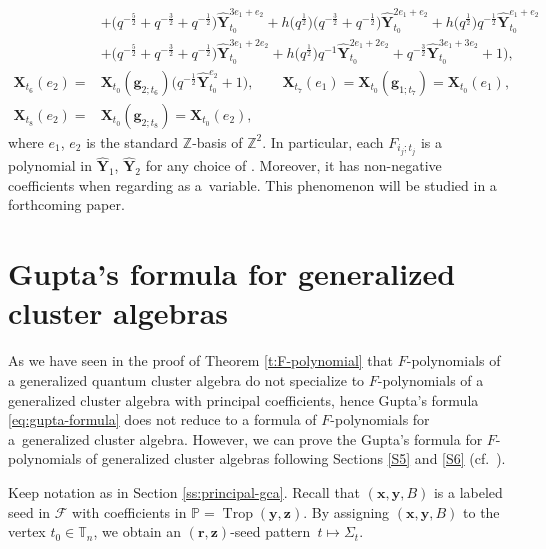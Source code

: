 \documentclass[pdftex]{sigma}
\numberwithin{equation}{section}
\begin{document}
\begin{Example}[type $G_{2}$]
\begin{align*}
 & +\bigl(q^{-\frac{5}{2}}+q^{-\frac{3}{2}}+q^{-\frac{1}{2}}\bigr)\mathbf{\hat{Y}}_{t_0}^{3e_1+e_2}+h\bigl(q^{\frac{1}{2}}\bigr)\bigl(q^{-\frac{3}{2}}+q^{-\frac{1}{2}}\bigr)
 \mathbf{\hat{Y}}_{t_0}^{2e_1+e_2}+h\bigl(q^{\frac{1}{2}}\bigr)q^{-\frac{1}{2}}\mathbf{\hat{Y}}_{t_0}^{e_1+e_2}\\
 & +\bigl(q^{-\frac{5}{2}}+q^{-\frac{3}{2}}+q^{-\frac{1}{2}}\bigr)\mathbf{\hat{Y}}_{t_0}^{3e_1+2e_2}+h\bigl(q^{\frac{1}{2}}\bigr)q^{-1}\mathbf{\hat{Y}}_{t_0}^{2e_1+2e_2}
 +q^{-\frac{3}{2}}\mathbf{\hat{Y}}_{t_0}^{3e_1+3e_2}+1
 \bigr),\\
 \mathbf{X}_{t_6}(e_2)={}&\mathbf{X}_{t_0}(\mathbf{g}_{2;t_6})\bigl(q^{-\frac{1}{2}}\mathbf{\hat{Y}}_{t_0}^{e_2}+1\bigr),\qquad
 \mathbf{X}_{t_7}(e_1)= \mathbf{X}_{t_0}(\mathbf{g}_{1;t_7})=\mathbf{X}_{t_0}(e_1),\\
 \mathbf{X}_{t_8}(e_2)={}&\mathbf{X}_{t_0}(\mathbf{g}_{2;t_8})=\mathbf{X}_{t_0}(e_{2}),
\end{align*}
where $e_1$, $e_2$ is the standard $\mathbb{Z}$-basis of $\mathbb{Z}^2$.
In particular, each $F_{i_j;t_j}$ is a polynomial in $\mathbf{\hat{Y}}_{1}$, $\mathbf{\hat{Y}}_2$ for any choice of . Moreover, it has non-negative coefficients when regarding  as a~variable. This phenomenon will be studied in a forthcoming paper.
\end{Example}



\section{Gupta's formula for generalized cluster algebras} \label{s:gupta-formula-gca}
As we have seen in the proof of Theorem \ref{t:F-polynomial} that $F$-polynomials of a generalized quantum cluster algebra do not specialize to $F$-polynomials of a generalized cluster algebra with principal coefficients, hence Gupta's formula \eqref{eq:gupta-formula} does not reduce to a formula of $F$-polynomials for a~generalized cluster algebra.
However, we can prove the Gupta's formula for $F$-polynomials of generalized cluster algebras following Sections \ref{S5} and \ref{S6} (cf.\ \cite{LMN2023}).

Keep notation as in Section \ref{ss:principal-gca}. Recall that $(\mathbf{x},\mathbf{y},B)$ is a labeled seed in $\mathcal{F}$ with coefficients in $\mathbb{P}=\operatorname{Trop}(\mathbf{y},\mathbf{z})$.
By assigning $(\mathbf{x},\mathbf{y},B)$ to the vertex $t_0\in \mathbb{T}_n$, we obtain an $(\mathbf{r},\mathbf{z})$-seed pattern~${t\mapsto \Sigma_t}$.
\end{document}
